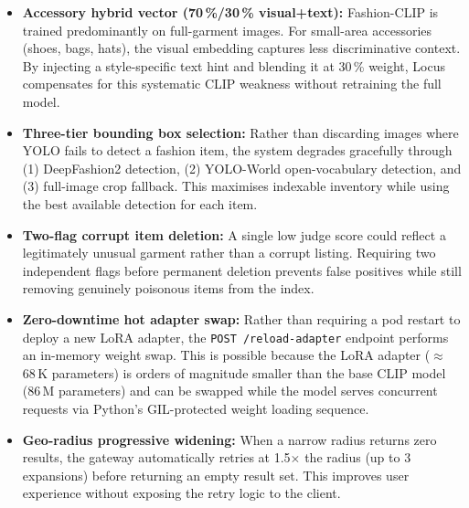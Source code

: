 \documentclass[12pt]{article}
\begin{document}
\begin{itemize}[leftmargin=*]
  \item \textbf{Accessory hybrid vector (70\,\%/30\,\% visual+text):} Fashion-CLIP is trained predominantly on full-garment images. For small-area accessories (shoes, bags, hats), the visual embedding captures less discriminative context. By injecting a style-specific text hint and blending it at 30\,\% weight, Locus compensates for this systematic CLIP weakness without retraining the full model.

  \item \textbf{Three-tier bounding box selection:} Rather than discarding images where YOLO fails to detect a fashion item, the system degrades gracefully through (1) DeepFashion2 detection, (2) YOLO-World open-vocabulary detection, and (3) full-image crop fallback. This maximises indexable inventory while using the best available detection for each item.

  \item \textbf{Two-flag corrupt item deletion:} A single low judge score could reflect a legitimately unusual garment rather than a corrupt listing. Requiring two independent flags before permanent deletion prevents false positives while still removing genuinely poisonous items from the index.

  \item \textbf{Zero-downtime hot adapter swap:} Rather than requiring a pod restart to deploy a new LoRA adapter, the \texttt{POST /reload-adapter} endpoint performs an in-memory weight swap. This is possible because the LoRA adapter ($\approx$68\,K parameters) is orders of magnitude smaller than the base CLIP model (86\,M parameters) and can be swapped while the model serves concurrent requests via Python's GIL-protected weight loading sequence.

  \item \textbf{Geo-radius progressive widening:} When a narrow radius returns zero results, the gateway automatically retries at 1.5$\times$ the radius (up to 3 expansions) before returning an empty result set. This improves user experience without exposing the retry logic to the client.
\end{itemize}
\end{document}
